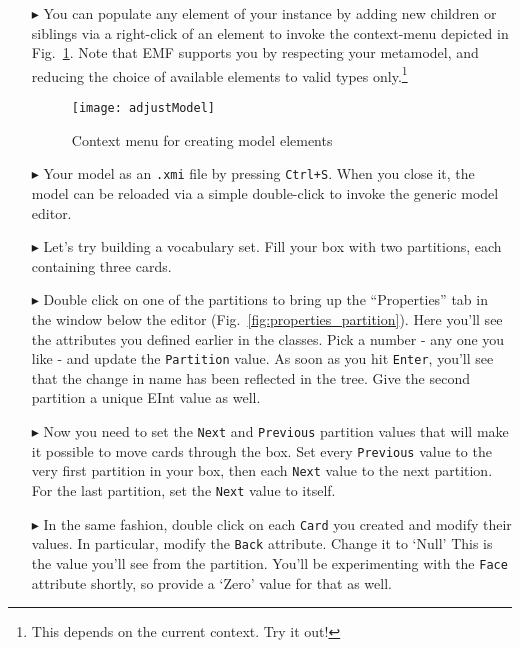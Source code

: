 \begin{itemize}
\clearpage

\item[$\blacktriangleright$] You can populate any element of your instance by adding new children or siblings via a right-click of an element to invoke the
context-menu depicted in Fig.~\ref{fig:create_instance}. Note that EMF supports you by respecting your metamodel, and reducing the choice of available elements
to valid types only.\footnote{This depends on the current context. Try it out!}

\begin{figure}[htbp]
	\centering
  \texttt{[image: adjustModel]}
	\caption{Context menu for creating model elements}
	\label{fig:create_instance}
\end{figure}

\item[$\blacktriangleright$] Your model as an \texttt{.xmi} file by pressing \texttt{Ctrl+S}. When you close it, the model can be reloaded via a simple
double-click to invoke the generic model editor.

\item[$\blacktriangleright$] Let's try building a vocabulary set. Fill your box with two partitions, each containing three cards.

\item[$\blacktriangleright$] Double click on one of the partitions to bring up the ``Properties'' tab in the window below the editor
(Fig.~\ref{fig:properties_partition}). Here you'll see the attributes you defined earlier in the classes. Pick a number - any one you like - and update the
\texttt{Partition} value. As soon as you hit \texttt{Enter}, you'll see that the change in name has been reflected in the tree. Give the second partition a
unique EInt value as well.

\item[$\blacktriangleright$] Now you need to set the \texttt{Next} and \texttt{Previous} partition values that will make it possible to move cards through the
box. Set every \texttt{Previous} value to the very first partition in your box, then each \texttt{Next} value to the next partition. For the last partition, set
the \texttt{Next} value to itself. 

\item[$\blacktriangleright$] In the same fashion, double click on each \texttt{Card} you created and modify their values. In particular, modify the
\texttt{Back} attribute. Change it to `Null' This is the value you'll see from the partition. You'll be experimenting with the \texttt{Face} attribute shortly,
so provide a `Zero' value for that as well.


\end{itemize}
